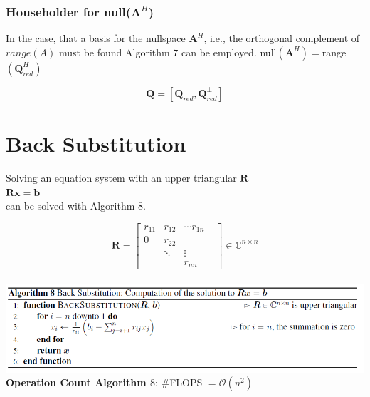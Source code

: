\documentclass[english]{latex4ei/latex4ei_sheet}
\begin{document}
\begin{sectionbox}
    \subsubsection{Householder for null($\mathbf{A}^H$)}

    In the case, that a basis for the nullspace $\mathbf{A}^H$, i.e., the orthogonal complement of $range(A)$ must be found Algorithm $7$ can be employed. null$(\mathbf{A}^H)=$range$(\mathbf{Q}_{red}^H)$

    $$\mathbf{Q} = [\mathbf{Q}_{red}, \mathbf{Q}_{red}^\perp]$$

\end{sectionbox}
\section{Back Substitution}
\begin{sectionbox}
    Solving an equation system with an upper triangular $\mathbf{R}$\\
    $\mathbf{R}\mathbf{x} = \mathbf{b}$\\
    can be solved with Algorithm $8$.


    $$\mathbf{R}= \begin{bmatrix}
            r_{11} & r_{12} & \cdots r_{1n}   \\
            0      & r_{22} &                 \\
                   & \ddots & \vdots          \\
                   &        & r_{nn}        &
        \end{bmatrix}\in\mathbb{C}^{n\times n}$$\\

    \includegraphics[width=\textwidth]{img/algo8_backsub.png}\\
    \textbf{Operation Count Algorithm $8$}: \#FLOPS $=\mathcal{O}(n^2)$\\
\end{sectionbox}
\end{document}
